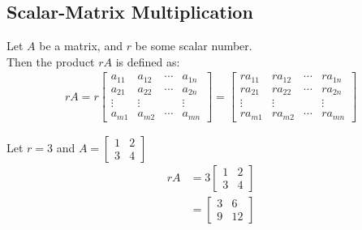 \documentclass[../notes.tex]{subfiles}
\begin{document}
			\subsection{Scalar-Matrix Multiplication}
				Let $A$ be a matrix, and $r$ be some scalar number.\\
				Then the product $rA$ is defined as:
				\begin{align*}
					rA = r \begin{bmatrix}
						a_{11} & a_{12} & \cdots & a_{1n}\\
						a_{21} & a_{22} & \cdots & a_{2n}\\
						\vdots & \vdots & & \vdots\\
						a_{m1} & a_{m2} & \cdots & a_{mn}
					\end{bmatrix}
					= \begin{bmatrix}
						ra_{11} & ra_{12} & \cdots & ra_{1n}\\
						ra_{21} & ra_{22} & \cdots & ra_{2n}\\
						\vdots & \vdots & & \vdots\\
						ra_{m1} & ra_{m2} & \cdots & ra_{mn}
					\end{bmatrix}
				\end{align*}
				\begin{examplebox}
					Let $r = 3$ and $A = \begin{bmatrix}
						1 & 2\\
						3 & 4
					\end{bmatrix}$
					\begin{align*}
						rA &= 3\begin{bmatrix}
							1 & 2\\
							3 & 4
						\end{bmatrix}\\
						&= \begin{bmatrix}
							3 & 6\\
							9 & 12
						\end{bmatrix}
					\end{align*}
				\end{examplebox}
\end{document}
